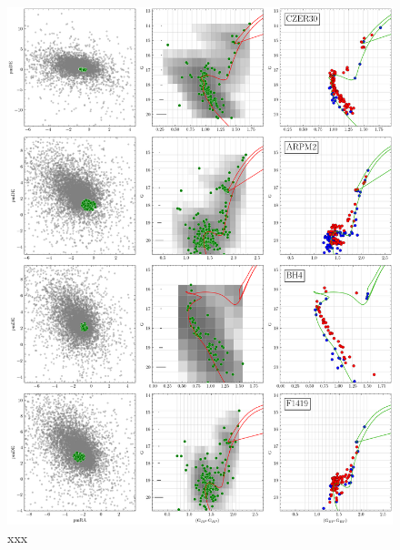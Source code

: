 \documentclass{aa}
\begin{document}
\begin{appendix}
 \begin{figure}
  \centering
  \includegraphics[height=.95\textheight]{figs/8_fpars.png}
  \caption{xxx}
  \label{fig:12fpars}
 \end{figure}


\end{appendix}
\end{document}
